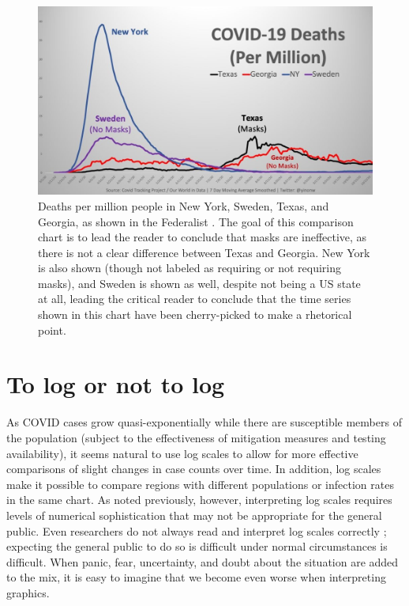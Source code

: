 \documentclass[article]{jdssv}\usepackage[]{graphicx}\usepackage[]{color}
\begin{document}
\begin{figure}
\centering
\includegraphics[width=.8\linewidth]{Figures_Web/Deaths-NY-TX-GA-Sweden-Federalist.jpeg}
\caption{Deaths per million people in New York, Sweden, Texas, and Georgia, as shown in the Federalist \citep{weissThese12Graphs2020}. The goal of this comparison chart is to lead the reader to conclude that masks are ineffective, as there is not a clear difference between Texas and Georgia. New York is also shown (though not labeled as requiring or not requiring masks), and Sweden is shown as well, despite not being a US state at all, leading the critical reader to conclude that the time series shown in this chart have been cherry-picked to make a rhetorical point.}\label{fig:policy-comparison}
\end{figure}



\section{To log or not to log}\label{sec:logs}
As COVID cases grow quasi-exponentially while there are susceptible members of the population (subject to the effectiveness of mitigation measures and testing availability), it seems natural to use log scales to allow for more effective comparisons of slight changes in case counts over time. In addition, log scales make it possible to compare regions with different populations or infection rates in the same chart. As noted previously, however, interpreting log scales requires levels of numerical sophistication that may not be appropriate for the general public. Even researchers do not always read and interpret log scales correctly \citep{mengeLogarithmicScalesEcological2018}; expecting the general public to do so is difficult under normal circumstances \citep{hecklerStudentAccuracyReading2013} is difficult. When panic, fear, uncertainty, and doubt about the situation are added to the mix, it is easy to imagine that we become even worse when interpreting graphics.
\end{document}
